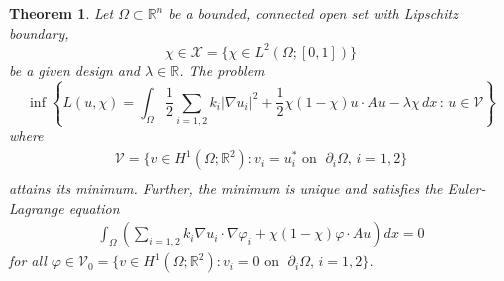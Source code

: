 \documentclass[11pt]{article}
\newtheorem{theorem}{Theorem}[section]
\begin{document}
\begin{theorem}
\label{existence}
Let $\Omega\subset\mathbb{R}^n$ be a bounded, connected open set with Lipschitz boundary,
$$\chi \in \mathcal{X} = \{\chi\in L^2(\Omega;[0,1])\}$$
be a given design and $\lambda \in {\mathbb R}$. The problem 
$$
 \inf\left\{L(u,\chi) = \int_\Omega \frac{1}{2} \sum_{i=1,2} k_i |\nabla u_i|^2 + \frac{1}{2} \chi(1-\chi)u \cdot A u -\lambda\chi\,dx\,:\, u\in\mathcal{V}\right\}
$$
where 
\begin{align*}
\mathcal{V}=\{v\in H^1(\Omega;\mathbb{R}^2):v_i=u_i^*\text{ on }\;\partial_{i}\Omega,\,i=1,2\}\\
\end{align*}
attains its minimum.  Further, the minimum is unique and satisfies the Euler-Lagrange equation
\begin{align} \label{eq:elw}
\int_\Omega \left( \sum_{i=1,2} k_i \nabla u_i \cdot \nabla \varphi_i + \chi(1-\chi) \varphi \cdot A u \right) dx
=0
\end{align}
for all $\varphi \in {\mathcal V}_0 = \{v\in H^1(\Omega;\mathbb{R}^2):v_i=0\text{ on }\;\partial_{i}\Omega,\,i=1,2\}$.
%

\end{theorem}
\end{document}
